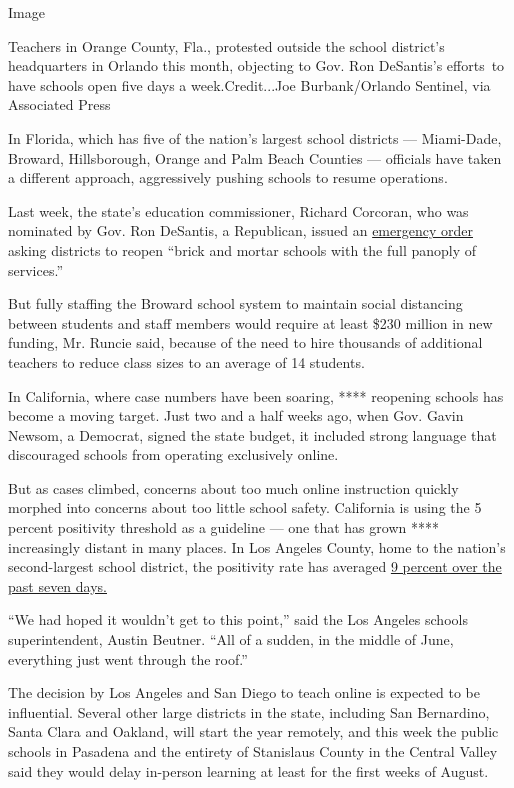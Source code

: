 Image

Teachers in Orange County, Fla., protested outside the school district's
headquarters in Orlando this month, objecting to Gov. Ron DeSantis's
efforts~to have schools open five days a week.Credit...Joe
Burbank/Orlando Sentinel, via Associated Press

In Florida, which has five of the nation's largest school districts ---
Miami-Dade, Broward, Hillsborough, Orange and Palm Beach Counties ---
officials have taken a different approach, aggressively pushing schools
to resume operations.

Last week, the state's education commissioner, Richard Corcoran, who was
nominated by Gov. Ron DeSantis, a Republican, issued an
\href{http://www.fldoe.org/core/fileparse.php/19861/urlt/DOE-2020-EO-06.pdf}{emergency
order} asking districts to reopen ``brick and mortar schools with the
full panoply of services.''

But fully staffing the Broward school system to maintain social
distancing between students and staff members would require at least
\$230 million in new funding, Mr. Runcie said, because of the need to
hire thousands of additional teachers to reduce class sizes to an
average of 14 students.

In California, where case numbers have been soaring, **** reopening
schools has become a moving target. Just two and a half weeks ago, when
Gov. Gavin Newsom, a Democrat, signed the state budget, it included
strong language that discouraged schools from operating exclusively
online.

But as cases climbed, concerns about too much online instruction quickly
morphed into concerns about too little school safety. California is
using the 5 percent positivity threshold as a guideline --- one that has
grown **** increasingly distant in many places. In Los Angeles County,
home to the nation's second-largest school district, the positivity rate
has averaged
\href{http://publichealth.lacounty.gov/media/coronavirus/data/index.htm}{9
percent over the past seven days.}

``We had hoped it wouldn't get to this point,'' said the Los Angeles
schools superintendent, Austin Beutner. ``All of a sudden, in the middle
of June, everything just went through the roof.''

The decision by Los Angeles and San Diego to teach online is expected to
be influential. Several other large districts in the state, including
San Bernardino, Santa Clara and Oakland, will start the year remotely,
and this week the public schools in Pasadena and the entirety of
Stanislaus County in the Central Valley said they would delay in-person
learning at least for the first weeks of August.

